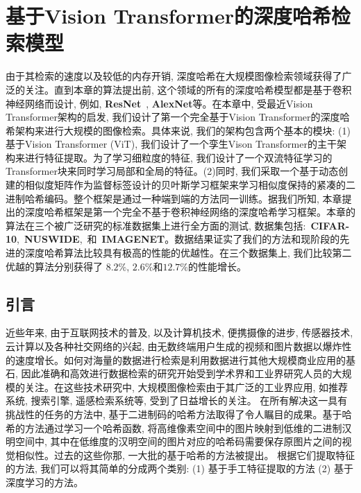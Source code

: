 \chapter{基于Vision Transformer的深度哈希检索模型}
由于其检索的速度以及较低的内存开销, 深度哈希在大规模图像检索领域获得了广泛的关注。直到本章的算法提出前, 这个领域的所有的深度哈希模型都是基于卷积神经网络而设计, 例如, \textbf{ResNet}~\cite{he2016deep}, \textbf{AlexNet}等。在本章中, 受最近Vision Transformer架构的启发, 我们设计了第一个完全基于Vision Transformer的深度哈希架构来进行大规模的图像检索。具体来说, 我们的架构包含两个基本的模块: (1) 基于Vision Transformer (ViT), 我们设计了一个孪生Vison Transformer的主干架构来进行特征提取。为了学习细粒度的特征, 我们设计了一个双流特征学习的Transformer块来同时学习局部和全局的特征。(2)同时, 我们采取一个基于动态创建的相似度矩阵作为监督标签设计的贝叶斯学习框架来学习相似度保持的紧凑的二进制哈希编码。整个框架是通过一种端到端的方法同一训练。据我们所知, 本章提出的深度哈希框架是第一个完全不基于卷积神经网络的深度哈希学习框架。本章的算法在三个被广泛研究的标准数据集上进行全方面的测试, 数据集包括:~\textbf{CIFAR-10},~\textbf{NUSWIDE},~和~\textbf{IMAGENET}。数据结果证实了我们的方法和现阶段的先进的深度哈希算法比较具有极高的性能的优越性。在三个数据集上, 我们比较第二优越的算法分别获得了 $8.2\%$, $2.6 \%$和$12.7\%$的性能增长。

\section{引言}
近些年来, 由于互联网技术的普及, 以及计算机技术, 便携摄像的进步, 传感器技术, 云计算以及各种社交网络的兴起, 由无数终端用户生成的视频和图片数据以爆炸性的速度增长。如何对海量的数据进行检索是利用数据进行其他大规模商业应用的基石, 因此准确和高效进行数据检索的研究开始受到学术界和工业界研究人员的大规模的关注。在这些技术研究中, 大规模图像检索由于其广泛的工业界应用, 如推荐系统, 搜索引擎, 遥感检索系统等, 受到了日益增长的关注。 在所有解决这一具有挑战性的任务的方法中\cite{fu2017fast, ge2013optimized, jegou2010product, malkov2018efficient}, 基于二进制码的哈希方法取得了令人瞩目的成果。基于哈希的方法通过学习一个哈希函数, 将高维像素空间中的图片映射到低维的二进制汉明空间中, 其中在低维度的汉明空间的图片对应的哈希码需要保存原图片之间的视觉相似性。过去的这些你那, 一大批的基于哈希的方法被提出。 根据它们提取特征的方法, 我们可以将其简单的分成两个类别: (1) 基于手工特征提取的方法 (2) 基于深度学习的方法。\par

